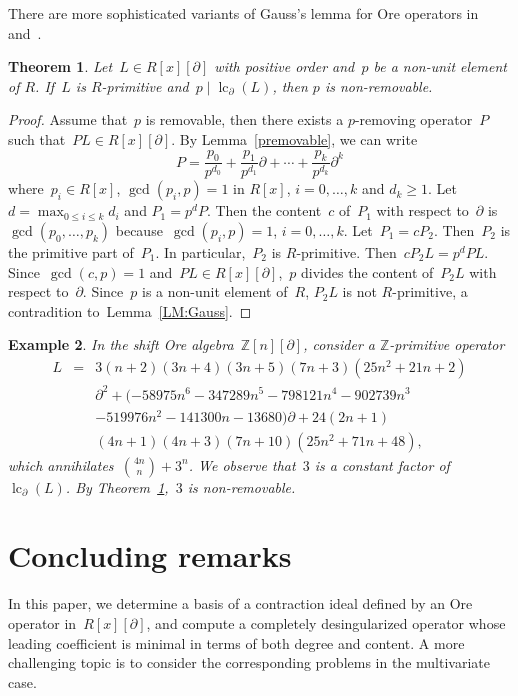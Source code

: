 \documentclass{sig-alternate}
\newcommand{\bZ} { {\mathbb{Z}}}
\newcommand{\lc}{\operatorname{lc}}
\newcommand{\pa}{\partial}
\newtheorem{theorem}{Theorem}[section]
\newtheorem{example}[theorem]{Example}
\begin{document}
There are more sophisticated variants of Gauss's lemma for Ore operators in~\cite[Proposition 2]{Kovacic1972} and~\cite[Lemma 9.5]{Zhang2009}.

\begin{theorem}\label{TH:cremovable}
Let~$L \in R[x][\pa]$ with positive order and~$p$ be a non-unit element of $R$.
If~$L$ is $R$-primitive and~$p \mid \lc_{\pa}(L)$, then $p$ is non-removable.
\end{theorem}

\begin{proof}
Assume that~$p$ is removable, then there exists a $p$-removing operator~$P$ such that~$PL \in R[x][\pa]$.
By Lemma~\ref{premovable}, we can write
\[
 P = \frac{p_0}{p^{d_0}} + \frac{p_1}{p^{d_1}} \pa + \cdots +
     \frac{p_{k}}{p^{d_{k}}} \pa^{k}
\]
where~$p_i \in R[x]$, $\gcd(p_i, p) = 1$ in $R[x]$, $i = 0, \ldots, k$ and $d_k \geq 1$. Let
$d = \max_{0 \leq i \leq k} d_i$ and $P_1 = p^d P$. Then the content~$c$ of~$P_1$  with respect to~$\pa$ is~$\gcd(p_0, \ldots, p_k)$
because~$\gcd(p_i, p) = 1$, $i = 0, \ldots, k.$
Let~$P_1=cP_2.$ Then~$P_2$ is the primitive part of~$P_1$. In particular,~$P_2$ is $R$-primitive.
Then~$ c P_2 L = p^d PL$.
Since~$\gcd(c, p) = 1$ and~$PL \in R[x][\pa]$,~$p$ divides the content of~$P_2L$ with respect to~$\pa$.
Since~$p$ is a non-unit element of~$R$, $P_2L$ is not $R$-primitive, a contradition to~Lemma~\ref{LM:Gauss}.
\end{proof}

\begin{example}\label{Example1}
In the shift Ore algebra~$\bZ[n][\pa]$, consider a $\bZ$-primitive operator
\begin{eqnarray*}
 L & = & 3 (n+2) (3 n+4) (3 n+5) (7 n+3) \left(25 n^2+21 n+2\right) \\
   &   & \pa^2 + (-58975 n^6-347289 n^5-798121 n^4-902739 n^3 \\
   &   & -519976 n^2-141300 n -13680 ) \pa + 24 (2 n+1) \\
   &   & (4 n+1) (4 n+3) (7 n+10) \left(25 n^2+71 n+48\right),
\end{eqnarray*}
which annihilates~$ \binom{4 n}{n}+ 3^n$.
We observe that~$3$ is a constant factor of~$\lc_{\pa}(L)$. By Theorem~\ref{TH:cremovable},~$3$ is non-removable.
\end{example}

\section{Concluding  remarks}
In this paper, we determine a basis of a contraction ideal defined by an Ore operator in~$R[x][\pa]$,
and compute a completely desingularized operator whose leading coefficient is minimal in terms of both degree and content.
A more challenging topic is to consider the corresponding problems in the multivariate case.
\end{document}
